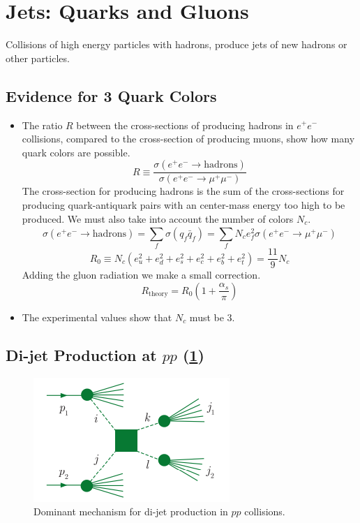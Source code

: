 \section{Jets: Quarks and Gluons}
Collisions of high energy particles with hadrons, produce jets of new hadrons or other particles. 

\subsection{Evidence for 3 Quark Colors}
\begin{itemize}
    \item The ratio $R$ between the cross-sections of producing hadrons in $e^+e^-$ collisions, compared to the cross-section of producing muons, show how many quark colors are possible. 
    \begin{equation}
      R ≡ \frac{σ(e^+e^- → \text{hadrons})}{σ(e^+e^- → μ^+μ^-)}
    \end{equation}
    The cross-section for producing hadrons is the sum of the cross-sections for producing quark-antiquark pairs with an center-mass energy too high to be produced. We must also take into account the number of colors $N_c$. 
    \begin{equation}
      σ(e^+e^- → \text{hadrons}) = ∑_{f}^{} σ(q_f \bar{q}_f) = ∑_{f}^{} N_c e^2_{f} σ(e^+e^- → μ^+μ^-)
    \end{equation}
    \begin{equation}
      R_0 ≡ N_c (e^2_{u} + e^2_{d} + e^2_{s} + e^2_{c} + e^2_{b} + e^2_{t}) = \frac{11}{9}N_c 
    \end{equation}
    Adding the gluon radiation we make a small correction. 
    \begin{equation}
      R_{\text{theory}} = R_0 \left(1 + \frac{α_s}{π}\right)
    \end{equation}
    \item The experimental values show that $N_c$ must be 3.
\end{itemize}


\subsection{Di-jet Production at $p p$ (\cref{fig: di-jet_production})}
\begin{figure}[h!]
\centering
\includegraphics[width = .45\textwidth]{di-jet_production.png}
\caption{Dominant mechanism for di-jet production in $pp$ collisions.}
\label{fig: di-jet_production}
\end{figure}


